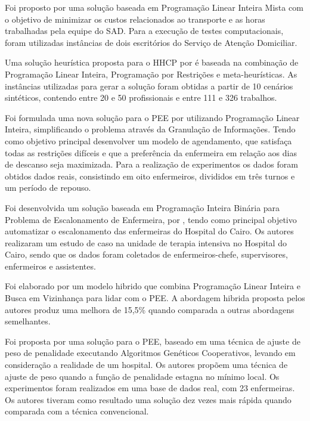 Foi proposto por \cite{Decerle:2016} uma solução baseada em Programação Linear Inteira Mista com o objetivo de minimizar os custos relacionados ao transporte e as horas trabalhadas pela equipe do \ac{SAD}. Para a execução de testes computacionais, foram utilizadas instâncias de dois escritórios do Serviço de Atenção Domiciliar.

Uma solução heurística proposta para o \ac{HHCP} por \cite{Bertels:2006} é baseada na combinação de Programação Linear Inteira, Programação por Restrições e meta-heurísticas. As instâncias utilizadas para gerar a solução foram obtidas a partir de 10 cenários sintéticos, contendo entre 20 e 50 profissionais e entre 111 e 326 trabalhos.

Foi formulada uma nova solução para o \ac{PEE} por \cite{baskaran:2014} utilizando Programação Linear Inteira, simplificando o problema através da Granulação de Informações. Tendo como objetivo principal desenvolver um modelo de agendamento, que satisfaça todas as restrições difíceis e que a preferência da enfermeira em relação aos dias de descanso seja maximizada. Para a realização de experimentos os dados foram obtidos dados reais, consistindo em oito enfermeiros, divididos em três turnos e um período de repouso.

Foi desenvolvida um solução baseada em Programação Inteira Binária para Problema de Escalonamento de Enfermeira, por \cite{Zen-El-Din:2012}, tendo como principal objetivo automatizar o escalonamento das enfermeiras do Hospital do Cairo. Os autores realizaram um estudo de caso  na unidade de terapia intensiva no Hospital do Cairo, sendo que os dados foram coletados de enfermeiros-chefe, supervisores, enfermeiros e assistentes.

Foi elaborado por \cite{burke:2010} um modelo hibrido que combina Programação Linear Inteira e Busca em Vizinhança para lidar com o \ac{PEE}. A abordagem hibrida proposta pelos autores produz uma melhora de 15,5\% quando comparada a outras abordagens semelhantes.

Foi proposta por \cite{ohki:2008} uma solução para o \ac{PEE}, baseado em uma técnica de ajuste de peso de penalidade executando Algoritmos Genéticos Cooperativos, levando em consideração a realidade de um hospital. Os autores propõem uma técnica de ajuste de peso quando a função de penalidade estagna no mínimo local. Os experimentos foram realizados em uma base de dados real, com 23 enfermeiras. Os autores tiveram como resultado uma solução dez vezes mais rápida quando comparada com a técnica convencional. 

